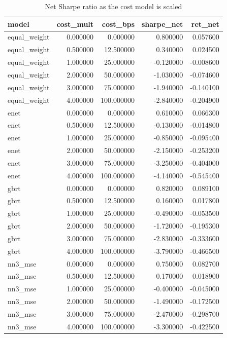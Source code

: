 \begin{table}
\caption{Net Sharpe ratio as the cost model is scaled}
\label{tab:t7_cost_sensitivity}
\begin{tabular}{lrrrr}
\toprule
model & cost\_mult & cost\_bps & sharpe\_net & ret\_net \\
\midrule
equal\_weight & 0.000000 & 0.000000 & 0.800000 & 0.057600 \\
equal\_weight & 0.500000 & 12.500000 & 0.340000 & 0.024500 \\
equal\_weight & 1.000000 & 25.000000 & -0.120000 & -0.008600 \\
equal\_weight & 2.000000 & 50.000000 & -1.030000 & -0.074600 \\
equal\_weight & 3.000000 & 75.000000 & -1.940000 & -0.140100 \\
equal\_weight & 4.000000 & 100.000000 & -2.840000 & -0.204900 \\
enet & 0.000000 & 0.000000 & 0.610000 & 0.066300 \\
enet & 0.500000 & 12.500000 & -0.130000 & -0.014800 \\
enet & 1.000000 & 25.000000 & -0.850000 & -0.095400 \\
enet & 2.000000 & 50.000000 & -2.150000 & -0.253200 \\
enet & 3.000000 & 75.000000 & -3.250000 & -0.404000 \\
enet & 4.000000 & 100.000000 & -4.140000 & -0.545400 \\
gbrt & 0.000000 & 0.000000 & 0.820000 & 0.089100 \\
gbrt & 0.500000 & 12.500000 & 0.160000 & 0.017800 \\
gbrt & 1.000000 & 25.000000 & -0.490000 & -0.053500 \\
gbrt & 2.000000 & 50.000000 & -1.720000 & -0.195300 \\
gbrt & 3.000000 & 75.000000 & -2.830000 & -0.333600 \\
gbrt & 4.000000 & 100.000000 & -3.790000 & -0.466500 \\
nn3\_mse & 0.000000 & 0.000000 & 0.750000 & 0.082700 \\
nn3\_mse & 0.500000 & 12.500000 & 0.170000 & 0.018900 \\
nn3\_mse & 1.000000 & 25.000000 & -0.400000 & -0.045000 \\
nn3\_mse & 2.000000 & 50.000000 & -1.490000 & -0.172500 \\
nn3\_mse & 3.000000 & 75.000000 & -2.470000 & -0.298700 \\
nn3\_mse & 4.000000 & 100.000000 & -3.300000 & -0.422500 \\

\end{tabular}
\end{table}
